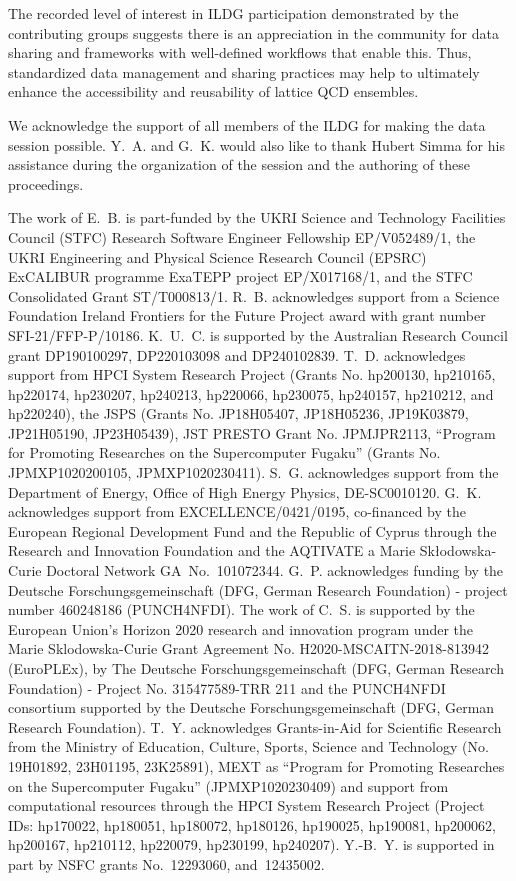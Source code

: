\documentclass[a4paper,11pt]{article}
\begin{document}
The recorded level of interest in ILDG participation demonstrated by
the contributing groups suggests there is an appreciation in the
community for data sharing and frameworks with well-defined workflows
that enable this. Thus, standardized data management and sharing
practices may help to ultimately enhance the accessibility and
reusability of lattice QCD ensembles.

\acknowledgments

We acknowledge the support of all members of the ILDG for making the
data session possible. Y.~A. and G.~K.  would also like to thank
Hubert Simma for his assistance during the organization of the session
and the authoring of these proceedings.

The work of E.~B. is part-funded by the UKRI Science and Technology
Facilities Council (STFC) Research Software Engineer Fellowship
EP/V052489/1, the UKRI Engineering and Physical Science Research
Council (EPSRC) ExCALIBUR programme ExaTEPP project EP/X017168/1, and
the STFC Consolidated Grant ST/T000813/1. R.~B. acknowledges support
from a Science Foundation Ireland Frontiers for the Future Project
award with grant number SFI-21/FFP-P/10186. K.~U.~C. is supported by
the Australian Research Council grant DP190100297, DP220103098 and
DP240102839. T.~D. acknowledges support from HPCI System Research
Project (Grants No. hp200130, hp210165, hp220174, hp230207, hp240213,
hp220066, hp230075, hp240157, hp210212, and hp220240), the JSPS
(Grants No. JP18H05407, JP18H05236, JP19K03879, JP21H05190,
JP23H05439), JST PRESTO Grant No. JPMJPR2113, ``Program for Promoting
Researches on the Supercomputer Fugaku'' (Grants No. JPMXP1020200105,
JPMXP1020230411). S.~G. acknowledges support from the Department of
Energy, Office of High Energy Physics, DE-SC0010120. G.~K. acknowledges
support from EXCELLENCE/0421/0195, co-financed by the European
Regional Development Fund and the Republic of Cyprus through the
Research and Innovation Foundation and the AQTIVATE a Marie
Sk\l{}odowska-Curie Doctoral Network GA~No.~101072344.
G.~P. acknowledges funding by the Deutsche Forschungsgemeinschaft
(DFG, German Research Foundation) - project number 460248186
(PUNCH4NFDI). The work of C.~S. is supported by the European Union's
Horizon 2020 research and innovation program under the Marie
Sklodowska-Curie Grant Agreement No. H2020-MSCAITN-2018-813942
(EuroPLEx), by The Deutsche Forschungsgemeinschaft (DFG, German
Research Foundation) - Project No. 315477589-TRR 211 and the
PUNCH4NFDI consortium supported by the Deutsche Forschungsgemeinschaft
(DFG, German Research Foundation). T.~Y.  acknowledges Grants-in-Aid
for Scientific Research from the Ministry of Education, Culture,
Sports, Science and Technology (No. 19H01892, 23H01195, 23K25891),
MEXT as ``Program for Promoting Researches on the Supercomputer
Fugaku'' (JPMXP1020230409) and support from computational resources
through the HPCI System Research Project (Project IDs: hp170022,
hp180051, hp180072, hp180126, hp190025, hp190081, hp200062, hp200167,
hp210112, hp220079, hp230199, hp240207). Y.-B.~Y. is supported in part
by NSFC grants No.~12293060, and~12435002.
\end{document}
